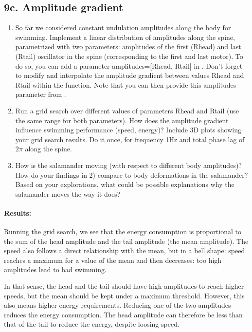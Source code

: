 \documentclass{cmc}
\begin{document}
\subsection*{9c. Amplitude gradient}
\label{sec:amplitude-gradient}

\begin{enumerate}
\item So far we considered constant undulation amplitudes along the body for
  swimming. Implement a linear distribution of amplitudes along the spine,
  parametrized with two parameters: amplitudes of the first (Rhead) and last
  (Rtail) oscillator in the spine (corresponding to the first and last
  motor). To do so, you can add a parameter amplitudes=[Rhead, Rtail] in
  . Don't forget to modify
  \-
  and interpolate the amplitude gradient between values Rhead and Rtail within
  the function. Note that you can then provide this amplitudes parameter from
  .
\item Run a grid search over different values of parameters Rhead and
  Rtail (use the same range for both parameters). How does the
  amplitude gradient influence swimming performance (speed, energy)?
  Include 3D plots showing your grid search results. Do it once, for
  frequency 1Hz and total phase lag of $2\pi$ along the spine.

\item How is the salamander moving (with respect to different body
  amplitudes)?  How do your findings in 2) compare to body
  deformations in the salamander?  Based on your explorations, what
  could be possible explanations why the salamander moves the way it
  does?
\end{enumerate}

\paragraph{Results:}
Running the grid search, we see that the energy consumption is proportional to the sum of the head amplitude and the tail amplitude (the mean amplitude). The speed also follows a direct relationship with the mean, but in a bell shape: speed reaches a maximum for a value of the mean and then decreases: too high amplitudes lead to bad swimming. 

In that sense, the head and the tail should have high amplitudes to reach higher speeds, but the mean should be kept under a maximum threshold. However, this also means higher energy requirements. Reducing one of the two amplitudes reduces the energy consumption. The head amplitude can therefore be less than that of the tail to reduce the energy, despite loosing speed. 
\end{document}
